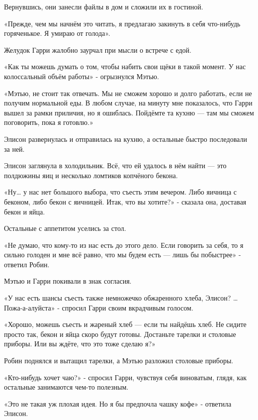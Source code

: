 \documentclass[a4paper,12pt]{book}
\begin{document}
\par
Вернувшись, они занесли файлы в дом и сложили их в гостиной.
\par
«Прежде, чем мы начнём это читать, я предлагаю закинуть в себя что-нибудь горяченькое. Я умираю от голода».
\par
Желудок Гарри жалобно заурчал при мысли о встрече с едой.
\par
«Как ты можешь думать о том, чтобы набить свои щёки в такой момент. У нас колоссальный объём работы» - огрызнулся Мэтью.
\par
«Мэтью, не стоит так отвечать. Мы не сможем хорошо и долго работать, если не получим нормальной еды. В любом случае, на минуту мне показалось, что Гарри вышел за рамки приличия, но я ошиблась. Пойдёмте та кухню — там мы сможем поговорить, пока я готовлю.»
\par
Элисон развернулась и отправилась на кухню, а остальные быстро последовали за ней.\\
\par
Элисон заглянула в холодильник. Всё, что ей удалось в нём найти — это полдюжины яиц и несколько ломтиков копчёного бекона.
\par
«Ну… у нас нет большого выбора, что съесть этим вечером. Либо яичница с беконом, либо бекон с яичницей. Итак, что вы хотите?» - сказала она, доставая бекон и яйца.
\par
Остальные с аппетитом уселись за стол.
\par
«Не думаю, что кому-то из нас есть до этого дело. Если говорить за себя, то я сильно голоден и мне всё равно, что мы будем есть — лишь бы побыстрее» - ответил Робин.
\par
Мэтью и Гарри покивали в знак согласия.
\par
«У нас есть шансы съесть также немножечко обжаренного хлеба, Элисон? … Пожа-а-алуйста» - спросил Гарри своим вкрадчивым голосом.
\par
«Хорошо, можешь съесть и жареный хлеб — если ты найдёшь хлеб. Не сидите просто так, бекон и яйца скоро будут готовы. Достаньте тарелки и столовые приборы. Или вы ждёте, что это тоже сделаю я?»
\par
Робин поднялся и вытащил тарелки, а Мэтью разложил столовые приборы.
\par
«Кто-нибудь хочет чаю?» - спросил Гарри, чувствуя себя виноватым, глядя, как остальные занимаются чем-то полезным.
\par
«Это не такая уж плохая идея. Но я бы предпочла чашку кофе» - ответила Элисон.
\par
\end{document}
